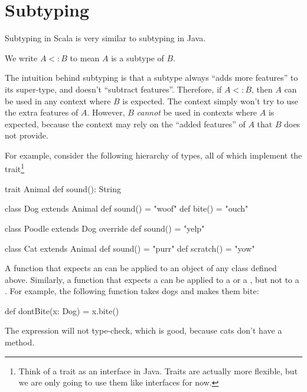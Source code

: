 \documentclass{book}
\begin{document}
\section{Subtyping}

Subtyping in Scala is very similar to subtyping in Java.

\begin{notation}
We write $A <: B$ to mean $A$ is a subtype of $B$.
\end{notation}

The intuition behind subtyping is that a subtype always ``adds more features''
to its super-type, and doesn't ``subtract features''. Therefore, if $A <: B$,
then $A$ can be used in any context where $B$ is expected. The context simply
won't try to use the extra features of $A$. However, $B$ \emph{cannot}
be used in contexts where $A$ is expected, because the context may rely on
the ``added features'' of $A$ that $B$ does not provide.

For example, consider the following hierarchy of types, all of which
implement the  trait\footnote{Think of a trait as an interface in Java. Traits
are actually more flexible, but we are only going to use them like interfaces for now.}
%
\begin{scalacode}
trait Animal {
  def sound(): String
}

class Dog extends Animal {
  def sound() = "woof"
  def bite() = "ouch"
}

class Poodle extends Dog {
  override def sound() = "yelp"
}

class Cat extends Animal {
  def sound() = "purr"
  def scratch() = "yow"
}
\end{scalacode}

A function that expects an  can be applied to an object
of any class defined above. Similarly, a function that expects a 
can be applied to a  or a , but not to a
. For example, the following function takes dogs and makes
them bite:
\begin{scalacode}
def dontBite(x: Dog) = {
  x.bite()
}
\end{scalacode}

The expression  will not type-check, which
is good, because cats don't have a  method.
\end{document}
